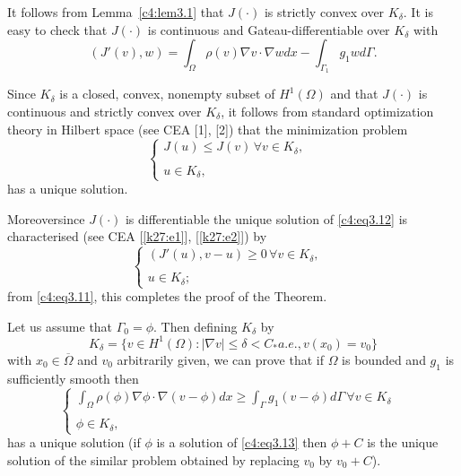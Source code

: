 It follows from Lemma~\ref{c4:lem3.1} that $J(\cdot)$ is strictly convex over $K_\delta$. It is easy to check that $J(\cdot)$ is continuous and Gateau-differentiable over $K_\delta$ with 
\begin{equation}
(J'(v), w) = \int_\Omega \rho (v) \nabla v \cdot \nabla w dx - \int_{\Gamma_1} g_1 w d \Gamma. \tag{3.11}\label{c4:eq3.11}
\end{equation}

Since $K_\delta$ is a closed, convex, nonempty subset of $H^1(\Omega)$ and that $J(\cdot)$ is continuous and strictly convex over $K_\delta$, it follows from standard optimization theory in Hilbert space (see CEA [1], [2]) that the minimization problem 
\begin{equation}
\begin{cases}
J(u) \leq J(v)\, \forall v \in K_\delta, \\
&\\
u \in K_\delta,
\end{cases}\tag{3.12}\label{c4:eq3.12}
\end{equation}
has a unique solution.

Moreover\pageoriginale  since $J(\cdot)$ is differentiable the unique
solution of \eqref{c4:eq3.12} is characterised (see CEA
[\ref{k27:e1}], [\ref{k27:e2}])  by  
\begin{equation*}
\begin{cases}
(J'(u), v-u) \geq 0\, \forall v \in K_\delta,\\
&\\
u \in  K_\delta ;
\end{cases}
\end{equation*}
from \eqref{c4:eq3.11}, this completes the proof of the Theorem. 

\begin{remark}\label{c4:rem3.4}%
Let us assume that $\Gamma_0 = \phi$. Then defining  $K_\delta$ by 
$$
K_\delta = \{v \in H^1(\Omega) : |\nabla v| \leq \delta < C_* a.e.,
v(x_0) = v_0\} 
$$
with $x_0 \in \overline{\Omega}$ and $v_0$ arbitrarily given, we can prove that if $\Omega$ is bounded and $g_1$ is sufficiently smooth then 
\begin{equation}
\begin{cases}
\int_\Omega \rho (\phi) \nabla \phi \cdot \nabla (v -\phi) dx \geq \int_\Gamma g_1 (v-\phi) d\Gamma\, \forall v \in K_\delta\\
&\\
\phi \in K_\delta,
\end{cases}\tag{3.13}\label{c4:eq3.13}
\end{equation}
has a unique solution (if $\phi$ is a solution of \eqref{c4:eq3.13} then $\phi + C$ is the unique solution of the similar problem obtained by replacing $v_0$ by $v_0 +C$).
\end{remark}

